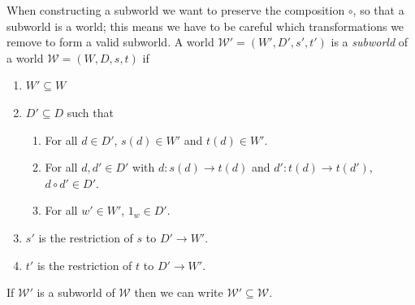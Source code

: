 When constructing a subworld we want to preserve the composition $\circ$, so that a subworld is a world; this means we have to be careful which transformations we remove to form a valid subworld.
A world $\mathscr{W}' = (W', D', s', t')$ is a \emph{subworld} of a world $\mathscr{W} = (W, D, s, t)$ if
\begin{enumerate}
    \item $W' \subseteq W$
    \item $D' \subseteq D$ such that
    \begin{enumerate}
        \item For all $d \in D'$, $s(d) \in W'$ and $t(d) \in W'$.
        \item For all $d, d' \in D'$ with $d: s(d) \to t(d)$ and $d': t(d) \to t(d')$, $d \circ d' \in D'$.
        \item For all $w' \in W'$, $1_{w} \in D'$.
    \end{enumerate}
    \item $s'$ is the restriction of $s$ to $D' \to W'$.
    \item $t'$ is the restriction of $t$ to $D' \to W'$.
\end{enumerate}

\begin{definition}
    If $\mathscr{W}'$ is a subworld of $\mathscr{W}$ then we can write $\mathscr{W}' \subseteq \mathscr{W}$.
\end{definition}

